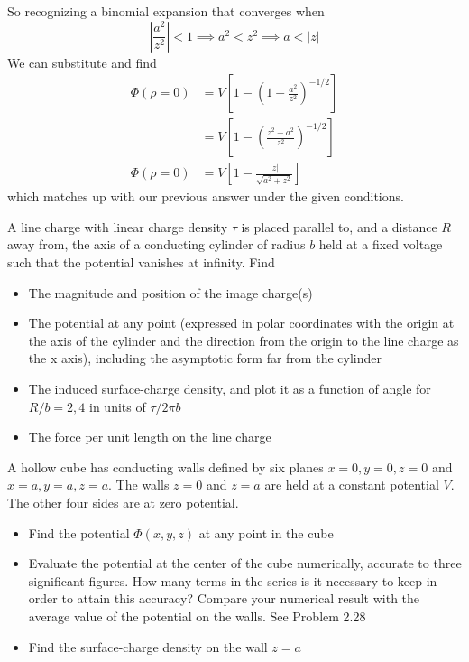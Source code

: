 \documentclass{article}
\begin{document}
So recognizing a binomial expansion that converges when \[\left|\frac{a^{2}}{z^{2}}\right|<1 \implies a^{2} < z^{2} \implies a < |z| \]
We can substitute and find
\begin{align*}
\Phi(\rho=0) &= V\left[ 1 - \left( 1 + \frac{a^{2}}{z^{2}} \right)^{-1/2} \right]\\
&= V\left[ 1 - \left(\frac{z^{2}+a^{2}}{z^{2}} \right)^{-1/2} \right]\\
\Phi(\rho=0) &= \boxed{V\left[ 1 - \frac{|z|}{\sqrt{a^{2}+z^{2}}} \right]}
\end{align*}
which matches up with our previous answer under the given conditions.

\setcounter{problem}{10}
\begin{problem}
A line charge with linear charge density $\tau$ is placed parallel to, and a distance $R$ away from, the axis of a conducting cylinder of radius $b$ held at a fixed voltage such that the potential vanishes at infinity. Find
\begin{itemize}
\item The magnitude and position of the image charge(s)
\item The potential at any point (expressed in polar coordinates with the origin at the axis of the cylinder and the direction from the origin to the line charge as the x axis), including the asymptotic form far from the cylinder
\item The induced surface-charge density, and plot it as a function of angle for $R/b = 2,4$ in units of $\tau/2\pi b$
\item The force per unit length on the line charge
\end{itemize}
\end{problem}

\setcounter{problem}{22}
\begin{problem}
A hollow cube has conducting walls defined by six planes $x=0,y=0,z=0$ and $x=a,y=a,z=a$. The walls $z=0$ and $z=a$ are held at a constant potential $V$. The other four sides are at zero potential.
\begin{itemize}
\item Find the potential $\Phi(x,y,z)$ at any point in the cube
\item Evaluate the potential at the center of the cube numerically, accurate to three significant figures. How many terms in the series is it necessary to keep in order to attain this accuracy? Compare your numerical result with the average value of the potential on the walls. See Problem 2.28
\item Find the surface-charge density on the wall $z=a$
\end{itemize}
\end{problem}
\end{document}
